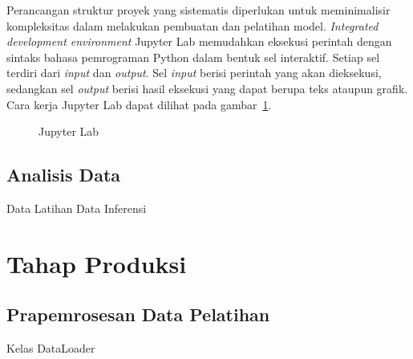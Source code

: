 Perancangan struktur proyek yang sistematis diperlukan untuk meminimalisir kompleksitas dalam
melakukan pembuatan dan pelatihan model. \textit{Integrated development environment} Jupyter Lab
memudahkan eksekusi perintah dengan sintaks bahasa pemrograman Python dalam bentuk sel interaktif.
Setiap sel terdiri dari
\textit{input} dan \textit{output}. Sel \textit{input} berisi perintah yang akan dieksekusi, sedangkan
sel \textit{output} berisi hasil eksekusi yang dapat berupa teks ataupun grafik. Cara kerja Jupyter Lab
dapat dilihat pada gambar~\ref{fig:jupyterlab}.
\begin{figure}[htbp]

    \begin{center}
    \end{center}
    \vspace{-20pt}
    \captionsetup{labelfont=bf, textfont=bf}
    \caption{Jupyter Lab}
    \vspace{-10pt}
    \captionsetup{labelfont=md, textfont=md}
    \label{fig:jupyterlab}
\end{figure}

\subsection{Analisis Data}
Data Latihan
Data Inferensi

\section{Tahap Produksi} \label{sec:3-TahapProduksi}

\subsection{Prapemrosesan Data Pelatihan}
Kelas DataLoader

